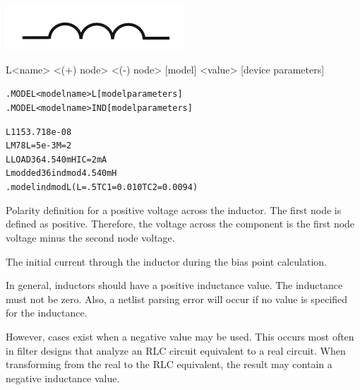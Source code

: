 


\begin{Device}\label{L_DEVICE}

\symbol
{\includegraphics{inductorSymbol}}

\device
L<name> <(+) node> <(-) node> [model] <value> [device parameters]

\model
\begin{alltt}
.MODEL <model name> L [model parameters]
.MODEL <model name> IND [model parameters]
\end{alltt}

\examples
\begin{alltt}
L1 1 5 3.718e-08
LM 7 8 L=5e-3 M=2
LLOAD 3 6 4.540mH IC=2mA
Lmodded 3 6 indmod 4.540mH
.model indmod L (L=.5 TC1=0.010 TC2=0.0094)
\end{alltt}

\parameters

\begin{Parameters}

Polarity definition for a positive voltage across the inductor. The
first node is defined as positive. Therefore, the voltage across the
component is the first node voltage minus the second node voltage.


The initial current through the inductor during the bias point
calculation.

\end{Parameters}

\comments
In general, inductors should have a positive
inductance value. The inductance must
not be zero.  Also, a netlist parsing error will occur if no value 
is specified for the inductance. 

However, cases exist when a negative value may be used.  This occurs most often
in filter designs that analyze an RLC circuit equivalent to a real circuit.
When transforming from the real to the RLC equivalent, the result may contain a
negative inductance value.


\end{Device}
